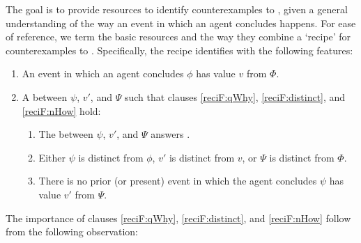 \begin{note}
  The goal is to provide resources to identify counterexamples to \issueInclusion{}, given a general understanding of the way an event in which an agent concludes happens.
  For ease of reference, we term the basic resources and the way they combine a `recipe' for counterexamples to \issueInclusion{}.
  Specifically, the recipe identifies  with the following features:
  \begin{enumerate}
  \item
    An event in which an agent concludes \(\phi\) has value \(v\) from \(\Phi\).
  \item
    A \ros{} between \(\psi\), \(v'\), and \(\Psi\) such that clauses \ref{reciF:qWhy}, \ref{reciF:distinct}, and \ref{reciF:nHow} hold:
    \begin{enumerate}[label=\Alph*., ref=\Alph*]
    \item
      \label{reciF:qWhy}
      The \ros{} between \(\psi\), \(v'\), and \(\Psi\) answers \qWhy{}.
    \item
      \label{reciF:distinct}
      Either \(\psi\) is distinct from \(\phi\), \(v'\) is distinct from \(v\), or \(\Psi\) is distinct from \(\Phi\).
    \item
      \label{reciF:nHow}
      There is no prior (or present) event in which the agent concludes \(\psi\) has value \(v'\) from \(\Psi\).
    \end{enumerate}
  \end{enumerate}
    The importance of clauses \ref{reciF:qWhy}, \ref{reciF:distinct}, and \ref{reciF:nHow} follow from the following observation:


\end{note}

